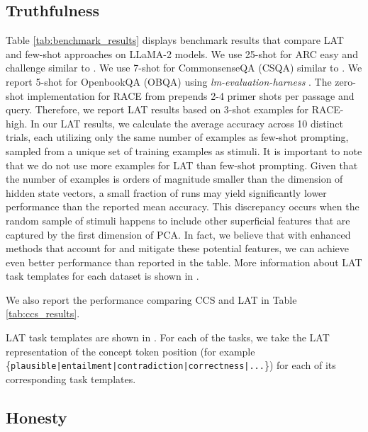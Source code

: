 \subsection{Truthfulness}\label{app:truthfulness}

\label{appendix:tqa_stdv}

\label{appendix:benchmakr_results}

Table \ref{tab:benchmark_results} displays benchmark results that compare LAT and few-shot approaches on LLaMA-2 models. We use 25-shot for ARC easy and challenge similar to \cite{open-llm-leaderboard}. We use 7-shot for CommonsenseQA (CSQA) similar to \cite{touvron2023llama}. We report 5-shot for OpenbookQA (OBQA) using \textit{lm-evaluation-harness} \citep{eval-harness}. The zero-shot implementation for RACE from \cite{DBLP:journals/corr/abs-2005-14165} prepends 2-4 primer shots per passage and query. Therefore, we report LAT results based on 3-shot examples for RACE-high. In our LAT results, we calculate the average accuracy across 10 distinct trials, each utilizing only the same number of examples as few-shot prompting, sampled from a unique set of training examples as stimuli. It is important to note that we do not use more examples for LAT than few-shot prompting. Given that the number of examples is orders of magnitude smaller than the dimension of hidden state vectors, a small fraction of runs may yield significantly lower performance than the reported mean accuracy. This discrepancy occurs when the random sample of stimuli happens to include other superficial features that are captured by the first dimension of PCA. In fact, we believe that with enhanced methods that account for and mitigate these potential features, we can achieve even better performance than reported in the table. More information about LAT task templates for each dataset is shown in .

We also report the performance comparing CCS \citep{burns2022discovering} and LAT in Table \ref{tab:ccs_results}. 


LAT task templates are shown in . For each of the tasks, we take the LAT representation of the concept token position (for example \{\texttt{plausible|entailment|contradiction|correctness|...}\}) for each of its corresponding task templates.

\subsection{Honesty}\label{app:honesty}



